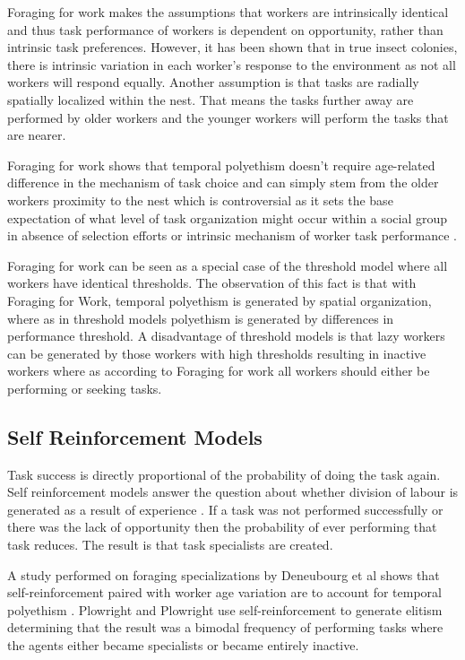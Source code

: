 Foraging for work makes the assumptions that workers are intrinsically identical and thus task performance of workers is dependent on opportunity, rather than intrinsic task preferences. However, it has been shown that in true insect colonies, there is intrinsic variation in each worker's response to the environment as not all workers will respond equally. Another assumption is that tasks are radially spatially localized within the nest. That means the tasks further away are performed by older workers and the younger workers will perform the tasks that are nearer.

Foraging for work shows that temporal polyethism doesn't require age-related difference in the mechanism of task choice and can simply stem from the older workers proximity to the nest which is controversial as it sets the base expectation of what level of task organization might occur within a social group in absence of selection efforts or intrinsic mechanism of worker task performance \cite{franks1994foraging}.

Foraging for work can be seen as a special case of the threshold model where all workers have identical thresholds. The observation of this fact is that with Foraging for Work, temporal polyethism is generated by spatial organization, where as in threshold models polyethism is generated by differences in performance threshold. A disadvantage of threshold models is that lazy workers can be generated by those workers with high thresholds resulting in inactive workers where as according to Foraging for work all workers should either be performing or seeking tasks.

\subsection{Self Reinforcement Models}
\label{selfreinforcement}

Task success is directly proportional of the probability of doing the task again. Self reinforcement models answer the question about whether division of labour is generated as a result of experience \cite{lerman2005review}. If a task was not performed successfully or there was the lack of opportunity then the probability of ever performing that task reduces. The result is that task specialists are created. 

A study performed on foraging specializations by Deneubourg et al shows that self-reinforcement paired with worker age variation are to account for temporal polyethism \cite{deneubourg1987self}. Plowright and Plowright use self-reinforcement to generate elitism \cite{plowright1988elitism} determining that the result was a bimodal frequency of performing tasks where the agents either became specialists or became entirely inactive.

